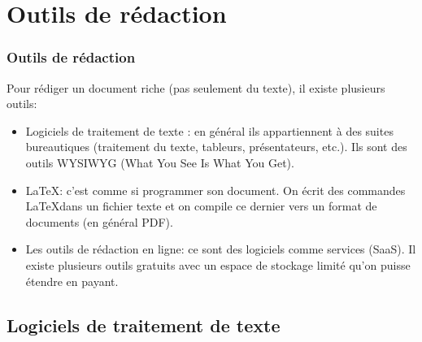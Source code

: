 \documentclass[xcolor=table]{beamer}
\begin{document}
\section{Outils de rédaction}

\begin{frame}
\frametitle{Outils de rédaction}

Pour rédiger un document riche (pas seulement du texte), il existe plusieurs outils:
%
\begin{itemize}
	\item Logiciels de traitement de texte : en général ils appartiennent à des suites bureautiques (traitement du texte, tableurs, présentateurs, etc.). Ils sont des outils WYSIWYG (What You See Is What You Get).
	\item \LaTeX : c'est comme si programmer son document. On écrit des commandes \LaTeX dans un fichier texte et on compile ce dernier vers un format de documents (en général PDF). 
	\item Les outils de rédaction en ligne: ce sont des logiciels comme services (SaaS). Il existe plusieurs outils gratuits avec un espace de stockage limité qu'on puisse étendre en payant.
\end{itemize}
\end{frame}

\subsection{Logiciels de traitement de texte}
\end{document}
